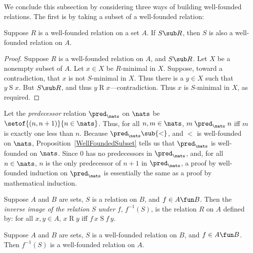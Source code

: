 We conclude this subsection by considering three ways of building
well-founded relations.  The first is by taking a subset of
a well-founded relation:

\begin{proposition}
\label{WellFoundedSubset}
Suppose $R$ is a well-founded relation on a set $A$.  If $S\sub R$,
then $S$ is also a well-founded relation on $A$.
\end{proposition}

\begin{proof}
Suppose $R$ is a well-founded relation on $A$, and $S\sub R$.  Let
$X$ be a nonempty subset of $A$.  Let $x\in X$ be $R$-minimal in $X$.
Suppose, toward a contradiction, that $x$ is not $S$-minimal in $X$.
Thus there is a $y\in X$ such that $y\mathrel{S}x$.  But $S\sub R$,
and thus $y\mathrel{R}x$---contradiction.  Thus $x$ is $S$-minimal
in $X$, as required.
\end{proof}

Let the \emph{predecessor} relation $\pred_\nats$ on $\nats$ be
$\setof{(n,n+1)}{n\in\nats}$.
%
%
%
%
%
%
Thus, for all $n,m\in\nats$, $m\mathrel{\pred_\nats}n$ iff $m$ is
exactly one less than $n$.  Because ${\pred_\nats}\sub{<}$, and $<$ is
well-founded on $\nats$, Proposition~\ref{WellFoundedSubset} tells us
that $\pred_\nats$ is well-founded on $\nats$.  Since $0$ has no
predecessors in $\pred_\nats$, and, for all $n\in\nats$, $n$ is the
only predecessor of $n+1$ in $\pred_\nats$, a proof by well-founded
induction on $\pred_\nats$ is essentially the same as a proof by
mathematical induction.

Suppose $A$ and $B$ are sets, $S$ is a relation on $B$, and $f\in
A\fun B$.  Then the \emph{inverse image of the relation} $S$
\emph{under} $f$, $f^{-1}(S)$, is the relation $R$ on $A$ defined
%
%
%
by: for all $x,y\in A$, $x\mathrel{R}y$ iff $f\,x\mathrel{S}f\,y$.

\begin{proposition}
\label{InverseImageWellFounded}
Suppose $A$ and $B$ are sets, $S$ is a well-founded relation on $B$,
and $f\in A\fun B$.  Then $f^{-1}(S)$ is a well-founded relation on $A$.
\end{proposition}

